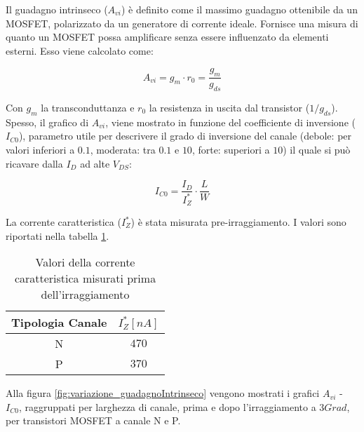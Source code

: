 Il guadagno intrinseco ($A_{vi}$) è definito come il massimo guadagno ottenibile da un MOSFET, polarizzato da un generatore di corrente ideale.
Fornisce una misura di quanto un MOSFET possa amplificare senza essere influenzato da elementi esterni.
Esso viene calcolato come:

$$A_{vi} = g_{m} \cdot r_0 = \frac{g_{m}}{g_{ds}} $$

Con $g_m$ la transconduttanza e $r_0$ la resistenza in uscita dal transistor (${1}/{g_{ds}}$). Spesso, il grafico di $A_{vi}$, viene mostrato in funzione del coefficiente di inversione ($I_{C0}$), parametro utile per descrivere il grado di inversione del canale (debole: per valori inferiori a $0.1$, moderata: tra $0.1$ e $10$, forte: superiori a $10$) il quale si può ricavare dalla $I_D$ ad alte $V_{DS}$:

$$I_{C0} = \frac{I_{D}}{I_{Z}^{*}} \cdot \frac{L}{W}$$

La corrente caratteristica ($I_{Z}^{*}$) è stata misurata pre-irraggiamento. I valori sono riportati nella tabella \ref{tab:corrente_caratteristica}.

\begin{table}[t]
    \centering
    \begin{tabular}{c c}
        \toprule
        Tipologia Canale & $I_{Z}^{*}[nA]$ \\
        \midrule
        N                & $470$     \\
        P                & $370$     \\
        \bottomrule
    \end{tabular}
    \caption[Valori estratti $I_z^*$]{Valori della corrente caratteristica misurati prima dell'irraggiamento}
    \label{tab:corrente_caratteristica}
\end{table}


Alla figura \ref{fig:variazione_guadagnoIntrinseco} vengono mostrati i grafici $A_{vi}$ - $I_{C0}$, raggruppati per larghezza di canale, prima e dopo l'irraggiamento a $3Grad$, per transistori MOSFET a canale N e P.


